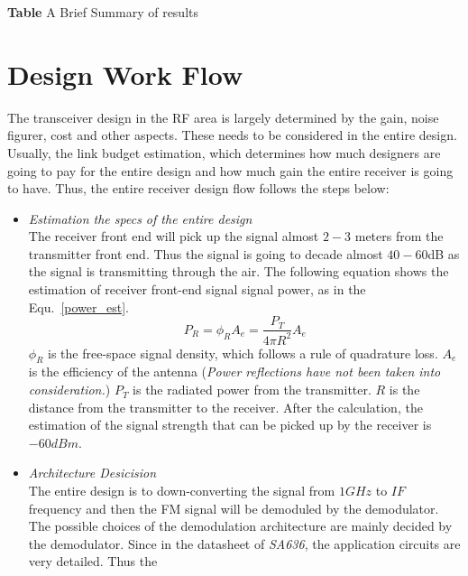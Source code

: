 \documentclass[]{article}
\begin{document}
\begin{center}
    \textbf{Table} A Brief Summary of results
\end{center}

\section{Design Work Flow}
The transceiver design in the RF area is largely determined by the gain, noise
figurer, cost and other aspects. These needs to be considered in the entire
design. Usually, the link budget estimation, which determines how much designers
are going to pay for the entire design and how much gain the entire receiver is
going to have.
Thus, the entire receiver design flow follows the steps below:
    \begin{itemize}
        \item \textit{Estimation the specs of the entire design} \\
            The receiver front end will pick up the signal almost $2-3$ meters
            from the transmitter front end. Thus the signal is going to decade
            almost $40-60$dB as the signal is transmitting through the air. The
            following equation shows the estimation of receiver front-end signal
            signal power, as in the Equ.~\ref{power_est}.
            \begin{equation}
                P_{R} = \phi_{R}A_{e}=\frac{P_{T}}{4\pi R^2}A_{e}
                \label{power_est}
            \end{equation}
            $\phi_{R}$ is the free-space signal density, which follows a rule of
            quadrature loss. $A_{e}$ is the efficiency of the antenna
            (\textit{Power reflections have not been taken into consideration.})
            $P_{T}$ is the radiated power from the transmitter. $R$ is the
            distance from the transmitter to the receiver. After the
            calculation, the estimation of the signal strength that can be
            picked up by the receiver is $-60dBm$.
        \item \textit{Architecture Desicision} \\
            The entire design is to down-converting the signal from $1GHz$ to
            $IF$ frequency and then the FM signal will be demoduled by the
            demodulator. The possible choices of the demodulation architecture
            are mainly decided by the demodulator. Since in the datasheet of
            \textit{SA636}, the application circuits are very detailed. Thus the

\end{itemize}
\end{document}
